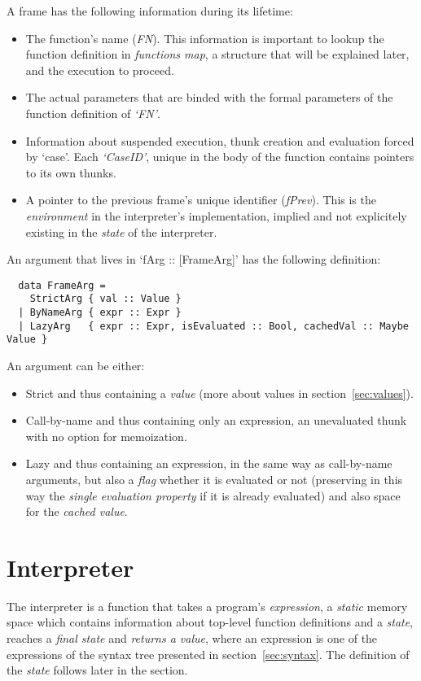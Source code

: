 \documentclass[diploma]{softlab-thesis}
\begin{document}
A frame has the following information during its lifetime:
\begin{itemize}
  \item The function's name (\textit{FN}). This information is important to lookup the function 
  definition in \textit{functions map}, a structure that will be explained later, and the execution to 
  proceed.
  \item The actual parameters that are binded with the formal parameters of the function 
  definition of \textit{`FN'}.
  \item Information about suspended execution, thunk creation and evaluation forced by `case'. Each \textit{`CaseID'}, 
  unique in the body of the function contains pointers to its own thunks.
  \item A pointer to the previous frame's unique identifier (\textit{fPrev}). This is the \textit{environment} in the 
  interpreter's implementation, implied and not explicitely existing in the \textit{state} of the interpreter.
\end{itemize} 
An argument that lives in `fArg :: [FrameArg]' has the following definition:

\begin{verbatim}
  data FrameArg = 
    StrictArg { val :: Value }
  | ByNameArg { expr :: Expr }
  | LazyArg   { expr :: Expr, isEvaluated :: Bool, cachedVal :: Maybe Value }  
\end{verbatim}

An argument can be either:
\begin{itemize}
  \item Strict and thus containing a \textit{value} (more about values in section~\ref{sec:values}).
  \item Call-by-name and thus containing only an expression, an unevaluated thunk with no option for 
  memoization.
  \item Lazy and thus containing an expression, in the same way as call-by-name arguments, 
  but also a \textit{flag} whether it is evaluated or not (preserving in this way the \textit{single evaluation property} if 
  it is already evaluated) and also space for the \textit{cached value}.
\end{itemize}

\section{Interpreter}

The interpreter is a function that takes a program's \textit{expression}, a \textit{static} memory space which contains 
information about top-level function definitions and a \textit{state}, 
reaches a \textit{final state} and \textit{returns a value}, where an expression is one of the expressions of the syntax 
tree presented in section~\ref{sec:syntax}. The definition of the \textit{state} follows later in the section.
\end{document}

